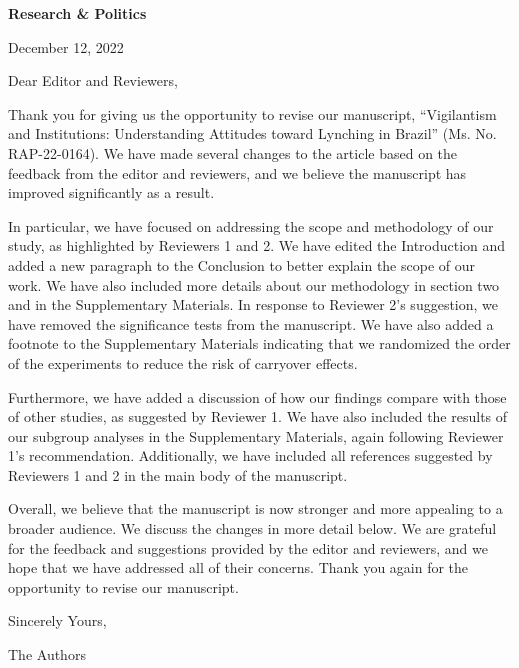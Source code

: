\documentclass[a4paper,12pt]{article}
\begin{document}
\doublespacing

\noindent \textbf{Research \& Politics}

\noindent December 12, 2022

\vspace{.5cm}

\noindent Dear Editor and Reviewers,

\vspace{.5cm}

Thank you for giving us the opportunity to revise our manuscript, ``Vigilantism
and Institutions: Understanding Attitudes toward Lynching in Brazil'' (Ms. No.
RAP-22-0164). We have made several changes to the article based on the feedback
from the editor and reviewers, and we believe the manuscript has improved
significantly as a result.

In particular, we have focused on addressing the scope and methodology of our
study, as highlighted by Reviewers 1 and 2. We have edited the Introduction and
added a new paragraph to the Conclusion to better explain the scope of our
work. We have also included more details about our methodology in section two
and in the Supplementary Materials. In response to Reviewer 2's suggestion, we
have removed the significance tests from the manuscript. We have also added a
footnote to the Supplementary Materials indicating that we randomized the order
of the experiments to reduce the risk of carryover effects.

Furthermore, we have added a discussion of how our findings compare with those
of other studies, as suggested by Reviewer 1. We have also included the results
of our subgroup analyses in the Supplementary Materials, again following
Reviewer 1's recommendation. Additionally, we have included all references
suggested by Reviewers 1 and 2 in the main body of the manuscript.

Overall, we believe that the manuscript is now stronger and more appealing to a
broader audience. We discuss the changes in more detail below. We are grateful
for the feedback and suggestions provided by the editor and reviewers, and we
hope that we have addressed all of their concerns. Thank you again for the
opportunity to revise our manuscript.

\vspace{.5cm}

\noindent Sincerely Yours,

\vspace{.5cm}

\noindent The Authors
\end{document}
